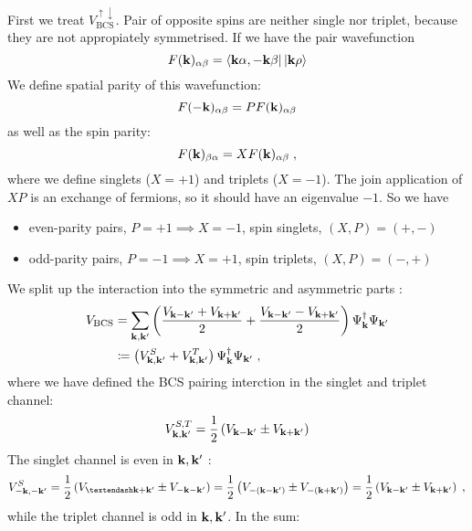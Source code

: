 First we treat \(V_{\text{BCS}}^{\uparrow \downarrow}\).
Pair of opposite spins are neither single nor triplet, because they are not appropiately symmetrised.
If we have the pair wavefunction
\begin{equation}
    F(\mathbf{k})_{\alpha \beta} = \bra{\mathbf{k}\alpha, -\mathbf{k}\beta} \ket{\mathbf{k}\rho}
\end{equation}
We define spatial parity of this wavefunction:
\begin{equation}
    F(-\mathbf{k})_{\alpha \beta} = P F(\mathbf{k})_{\alpha \beta}
\end{equation}
as well as the spin parity:
\begin{equation}
    F(\mathbf{k})_{\beta \alpha} = X F(\mathbf{k})_{\alpha \beta}
    \;,
\end{equation}
where we define singlets (\(X=+1\)) and triplets (\(X=-1\)).
The join application of \(XP\) is an exchange of fermions, so it should have an eigenvalue \(-1\).
So we have
\begin{itemize}
    \item even-parity pairs, \(P=+1 \implies X=-1\), spin singlets, \((X, P) = (+, -)\)
    \item odd-parity pairs, \(P=-1 \implies X=+1\), spin triplets, \((X, P) = (-, +)\)
\end{itemize}
We split up the interaction into the symmetric and asymmetric parts 
:
\begin{align}
    V_{\text{BCS}} &= \sum_{\mathbf{k}, \mathbf{k}^{\prime}} \left(\frac{V_{\mathbf{k} - \mathbf{k}^{\prime}} + V_{\mathbf{k} + \mathbf{k}^{\prime}}}{2} + \frac{V_{\mathbf{k} - \mathbf{k}^{\prime}} - V_{\mathbf{k} + \mathbf{k}^{\prime}}}{2}\right) \Psi_{\mathbf{k}}^{\dagger} \Psi_{\mathbf{k}^{\prime}} \\
    &\coloneq \left( V_{\mathbf{k}, \mathbf{k}^{\prime}}^S + V_{\mathbf{k}, \mathbf{k}^{\prime}}^T \right) \Psi_{\mathbf{k}}^{\dagger} \Psi_{\mathbf{k}^{\prime}}
    \;,
\end{align}
where we have defined the BCS pairing interction in the singlet and triplet channel:
\begin{equation}
    V_{\mathbf{k}, \mathbf{k}^{\prime}}^{S, T} = \frac{1}{2} \left( V_{\mathbf{k} - \mathbf{k}^{\prime}} \pm V_{\mathbf{k} + \mathbf{k}^{\prime}} \right)
\end{equation}
The singlet channel is even in \(\mathbf{k}, \mathbf{k}^{\prime}\) :
\begin{align}
    V_{-\vb{k}, -\vb{k}^{\prime}}^{S} = \frac{1}{2} \left( V_{–\vb{k} + \vb{k}^{\prime}} \pm V_{-\vb{k} - \vb{k}^{\prime}} \right)
    = \frac{1}{2} \left( V_{-(\vb{k} - \vb{k}^{\prime})} \pm V_{-(\vb{k} + \vb{k}^{\prime})} \right)
    = \frac{1}{2} \left( V_{\vb{k} - \vb{k}^{\prime}} \pm V_{\vb{k} + \vb{k}^{\prime}} \right)
    \;,
\end{align}
while the triplet channel is odd in \(\mathbf{k}, \mathbf{k}^{\prime}\).
In the sum:



